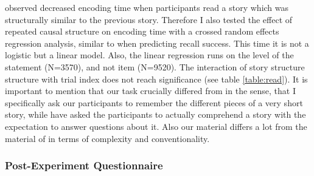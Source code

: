 \documentclass[a4paper,man,natbib,floatsintext,import]{apa6}
\begin{document}
\cite{Day2007} observed decreased encoding time when participants read a story which was structurally similar to the previous story. Therefore I also tested the effect of repeated causal structure on encoding time with a crossed random effects regression analysis, similar to when predicting recall success. This time it is not a logistic but a linear model. Also, the linear regression runs on the level of the statement (N=3570), and not item (N=9520). The interaction of story structure structure with trial index does not reach significance (see table \ref{table:read}). It is important to mention that our task crucially differed from \cite{Day2007} in the sense, that I specifically ask our participants to remember the different pieces of a very short story, while \cite{Day2007} have asked the participants to actually comprehend a story with the expectation to answer questions about it. Also our material differs a lot from the material of \cite{Day2007} in terms of complexity and conventionality.



\subsubsection{Post-Experiment Questionnaire}
\end{document}
